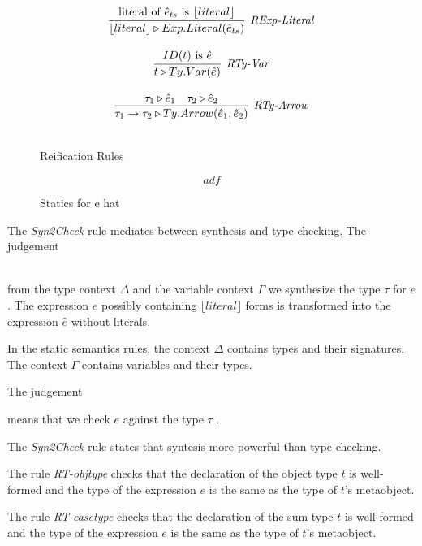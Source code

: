 \begin{figure}
\begin{minipage}{.5\textwidth}
\[\begin{array}{c}
\infer[\textit{RExp-Literal}]
	{ \lfloor literal \rfloor \triangleright Exp.Literal( \hat{e}_{ts} )  }
	{ \text{literal of}\ \hat{e}_{ts}\ \text{is}\ \lfloor literal \rfloor  } \\[3ex]

\infer[\textit{RTy-Var}]
	{ t \triangleright Ty.Var(\hat{e})   }
	{ ID(t)\ \text{is}\ \hat{e}} \\[3ex]

\infer[\textit{RTy-Arrow}]
	{ \tau_1 \rightarrow \tau_2 \triangleright Ty.Arrow(\hat{e}_1,\hat{e}_2 )  }
	{ \tau_1 \triangleright \hat{e}_1 & \tau_2 \triangleright \hat{e}_2 } \\[3ex]
   
\end{array}
\]
\caption{Reification Rules}
\end{minipage}
\end{figure}


\begin{figure}
\centering
\[
adf
\]
\caption{Statics for e hat}
\end{figure}


The \textit{Syn2Check} rule mediates between synthesis and type checking. 
The judgement 

\\
\noindent
from the type context $\Delta$ and the variable context $\Gamma$ we synthesize the type $\tau$ for $e$. The  expression $e$ possibly containing $\lfloor literal \rfloor$ forms is transformed into the expression $\hat{e}$ without literals.

In the static semantics rules, the context $\Delta$ contains types and their signatures. The context $\Gamma$ contains variables and their types. 

The judgement 


means that we check $e$ against the type $\tau$ . 

The \textit{Syn2Check} rule states that syntesis more powerful than type checking.

The rule \textit{RT-objtype} checks that the declaration of the object type $t$ is well-formed and the type of the expression $e$ is the same as the type of $t$'s metaobject.

The rule \textit{RT-casetype} checks that the declaration of the sum type $t$ is well-formed and the type of the expression $e$ is the same as the type of $t$'s metaobject.

